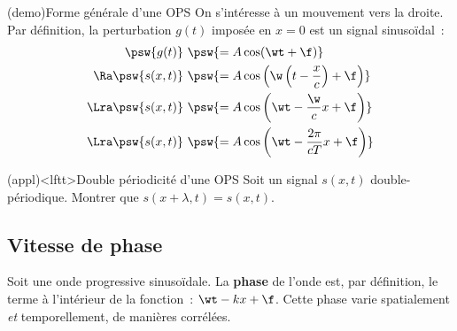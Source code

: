 \documentclass[../../main/main.tex]{subfiles}
\begin{document}
\begin{tcb*}(demo){Forme générale d'une OPS}
	On s'intéresse à un mouvement vers la droite. Par définition, la perturbation
	$g(t)$ imposée en $x=0$ est un signal sinusoïdal~:
	\begin{align*}
		\psw{g(t)}~   & \psw{= A\cos(\wt+\f)}
		\\\Ra
		\psw{s(x,t)}~ &
		\psw{= A\cos\left(\w\left(t - \frac{x}{c}\right) +\f\right)}
		\\\Lra
		\psw{s(x,t)}~ &
		\psw{= A\cos\left(\wt - \frac{\w}{c}x +\f\right)}
		\\\Lra
		\psw{s(x,t)}~ &
		\psw{= A\cos\left(\wt - \frac{2\pi}{cT}x +\f\right)}
	\end{align*}
\end{tcb*}

\begin{tcb*}(appl)<lftt>{Double périodicité d'une OPS}
	Soit un signal $s (x,t)$ double-périodique. Montrer que $s (x+\lambda,t) = s
		(x,t)$.
	\tcblower
	\begin{isd}[sidebyside align=top]
		\vspace{-15pt}
		\vspace{-15pt}
		\tcblower
		\vspace{-15pt}
		\vspace{-15pt}
	\end{isd}
	\vspace{-20pt}
\end{tcb*}

\subsection{Vitesse de phase}

Soit une onde progressive sinusoïdale. La \textbf{phase} de l'onde est, par
définition, le terme à l'intérieur de la fonction~: $\wt-kx+\f$. Cette phase
varie spatialement \textit{et} temporellement, de manières corrélées.
\end{document}
